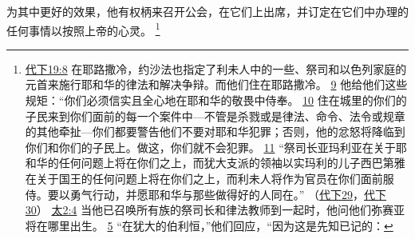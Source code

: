 \documentclass[12pt, a4paper, oneside]{ctexart}
\begin{document}
	为其中更好的效果，他有权柄来召开公会，在它们上出席，并订定在它们中办理的任何事情以按照上帝的心灵。
	\footnote {
		\href{https://biblehub.com/2_chronicles/19-8.htm}{代下19:8} 在耶路撒冷，约沙法也指定了利未人中的一些、祭司和以色列家庭的元首来施行耶和华的律法和解决争辩。而他们住在耶路撒冷。
		\href{https://biblehub.com/2_chronicles/19-9.htm}{9} 他给他们这些规矩：“你们必须信实且全心地在耶和华的敬畏中侍奉。
		\href{https://biblehub.com/2_chronicles/19-10.htm}{10} 住在城里的你们的子民来到你们面前的每一个案件中---不管是杀戮或是律法、命令、法令或规章的其他牵扯---你们都要警告他们不要对耶和华犯罪；否则，他的忿怒将降临到你们和你们的子民上。做这，你们就不会犯罪。
		\href{https://biblehub.com/2_chronicles/19-11.htm}{11} “祭司长亚玛利亚在关于耶和华的任何问题上将在你们之上，而犹大支派的领袖以实玛利的儿子西巴第雅在关于国王的任何问题上将在你们之上，而利未人将作为官员在你们面前服侍。要以勇气行动，并愿耶和华与那些做得好的人同在。”
		（\href{https://biblehub.com/niv/2_chronicles/29.htm}{代下29}，\href{https://biblehub.com/niv/2_chronicles/30.htm}{代下30}） 
		\href{https://biblehub.com/matthew/2-4.htm}{太2:4} 当他已召唤所有族的祭司长和律法教师到一起时，他问他们弥赛亚将在哪里出生。
		\href{https://biblehub.com/matthew/2-5.htm}{5} “在犹大的伯利恒，”他们回应，“因为这是先知已记的：
	}
\end{document}

